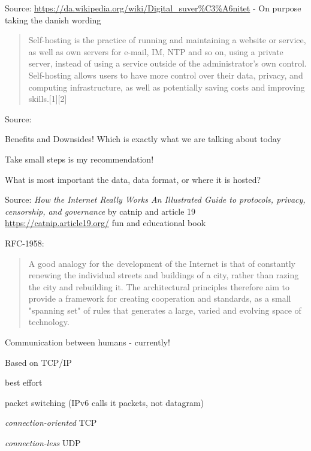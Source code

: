 \documentclass[Screen16to9,17pt]{foils}
\begin{document}
Source: \url{https://da.wikipedia.org/wiki/Digital_suver%C3%A6nitet} - On purpose taking the danish wording



\begin{quote}
Self-hosting is the practice of running and maintaining a website or service, as well as own servers for e-mail, IM, NTP and so on, using a private server, instead of using a service outside of the administrator's own control. Self-hosting allows users to have more control over their data, privacy, and computing infrastructure, as well as potentially saving costs and improving skills.[1][2]
\end{quote}
Source: 

\begin{list2}
\item Benefits and Downsides! Which is exactly what we are talking about today
\item Take small steps is my recommendation!
\item What is most important the data, data format, or where it is hosted?
\end{list2}




{\small Source: \emph{How the Internet Really Works
An Illustrated Guide to protocols, privacy, censorship, and governance} by catnip and article 19}\\
\url{https://catnip.article19.org/} {\color{red}\faHeart}
fun and educational book




RFC-1958:
\begin{quote}
 A good analogy for the development of the Internet is that of
 constantly renewing the individual streets and buildings of a city,
 rather than razing the city and rebuilding it. The architectural
 principles therefore aim to provide a framework for creating
 cooperation and standards, as a small "spanning set" of rules that
 generates a large, varied and evolving space of technology.
\end{quote}


\begin{list1}
\item Communication between humans - currently!
\item Based on TCP/IP
\begin{list2}
\item best effort
\item packet switching (IPv6 calls it packets, not datagram)
\item \emph{connection-oriented} TCP
\item \emph{connection-less} UDP
\end{list2}
\end{list1}
\end{document}
